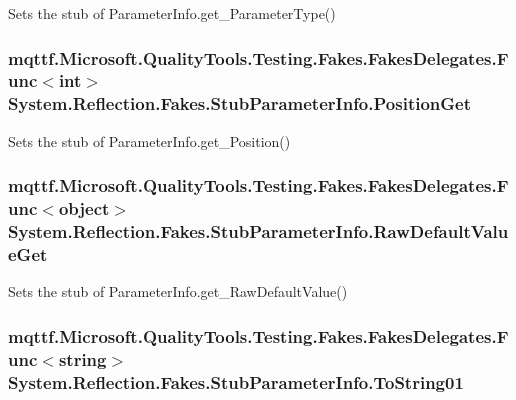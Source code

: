 Sets the stub of Parameter\-Info.\-get\-\_\-\-Parameter\-Type()

\hypertarget{class_system_1_1_reflection_1_1_fakes_1_1_stub_parameter_info_adc8e4d46c503987e745b77a7d94536c5}{
\subsubsection[{Position\-Get}]{\setlength{\rightskip}{0pt plus 5cm}mqttf.\-Microsoft.\-Quality\-Tools.\-Testing.\-Fakes.\-Fakes\-Delegates.\-Func$<$int$>$ System.\-Reflection.\-Fakes.\-Stub\-Parameter\-Info.\-Position\-Get}}\label{class_system_1_1_reflection_1_1_fakes_1_1_stub_parameter_info_adc8e4d46c503987e745b77a7d94536c5}


Sets the stub of Parameter\-Info.\-get\-\_\-\-Position()

\hypertarget{class_system_1_1_reflection_1_1_fakes_1_1_stub_parameter_info_a26b80d02fd4f13054f4754c58054f357}{
\subsubsection[{Raw\-Default\-Value\-Get}]{\setlength{\rightskip}{0pt plus 5cm}mqttf.\-Microsoft.\-Quality\-Tools.\-Testing.\-Fakes.\-Fakes\-Delegates.\-Func$<$object$>$ System.\-Reflection.\-Fakes.\-Stub\-Parameter\-Info.\-Raw\-Default\-Value\-Get}}\label{class_system_1_1_reflection_1_1_fakes_1_1_stub_parameter_info_a26b80d02fd4f13054f4754c58054f357}


Sets the stub of Parameter\-Info.\-get\-\_\-\-Raw\-Default\-Value()

\hypertarget{class_system_1_1_reflection_1_1_fakes_1_1_stub_parameter_info_a071a73bbfc4e40cfb0769002dd583335}{
\subsubsection[{To\-String01}]{\setlength{\rightskip}{0pt plus 5cm}mqttf.\-Microsoft.\-Quality\-Tools.\-Testing.\-Fakes.\-Fakes\-Delegates.\-Func$<$string$>$ System.\-Reflection.\-Fakes.\-Stub\-Parameter\-Info.\-To\-String01}}\label{class_system_1_1_reflection_1_1_fakes_1_1_stub_parameter_info_a071a73bbfc4e40cfb0769002dd583335}


